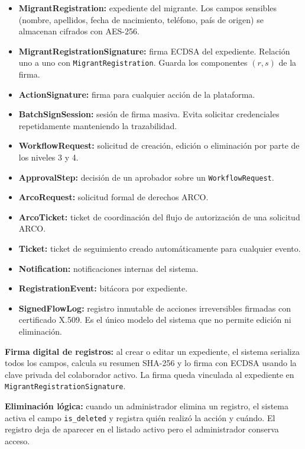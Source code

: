 \documentclass[10pt,letterpaper]{report}
\begin{document}
\begin{itemize}
    \item \textbf{MigrantRegistration:} expediente del migrante. Los campos sensibles (nombre, apellidos, fecha de nacimiento, teléfono, país de origen) se almacenan cifrados con AES-256.
    \item \textbf{MigrantRegistrationSignature:} firma ECDSA del expediente. Relación uno a uno con \texttt{MigrantRegistration}. Guarda los componentes $(r, s)$ de la firma.
    \item \textbf{ActionSignature:} firma para cualquier acción de la plataforma.
    \item \textbf{BatchSignSession:} sesión de firma masiva. Evita solicitar credenciales repetidamente manteniendo la trazabilidad.
    \item \textbf{WorkflowRequest:} solicitud de creación, edición o eliminación por parte de los niveles 3 y 4.
    \item \textbf{ApprovalStep:} decisión de un aprobador sobre un \texttt{WorkflowRequest}.
    \item \textbf{ArcoRequest:} solicitud formal de derechos ARCO.
    \item \textbf{ArcoTicket:} ticket de coordinación del flujo de autorización de una solicitud ARCO.
    \item \textbf{Ticket:} ticket de seguimiento creado automáticamente para cualquier evento.
    \item \textbf{Notification:} notificaciones internas del sistema.
    \item \textbf{RegistrationEvent:} bitácora por expediente.
    \item \textbf{SignedFlowLog:} registro inmutable de acciones irreversibles firmadas con certificado X.509. Es el único modelo del sistema que no permite edición ni eliminación.
\end{itemize}

\textbf{Firma digital de registros:} al crear o editar un expediente, el sistema serializa todos los campos, calcula su resumen SHA-256 y lo firma con ECDSA usando la clave privada del colaborador activo. La firma queda vinculada al expediente en \texttt{MigrantRegistrationSignature}.

\textbf{Eliminación lógica:} cuando un administrador elimina un registro, el sistema activa el campo \texttt{is\_deleted} y registra quién realizó la acción y cuándo. El registro deja de aparecer en el listado activo pero el administrador conserva acceso.
\end{document}
